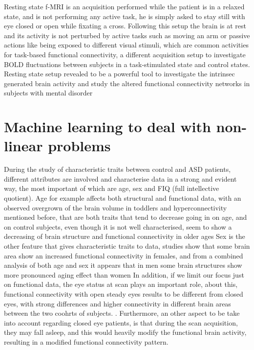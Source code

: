 \documentclass[10pt]{report}
\begin{document}
Resting state f-MRI is an acquisition performed while the patient is in a relaxed state, and is not performing any active task, he is simply asked to stay still with eye closed or open while fixating a cross.
Following this setup the brain is at rest and its activity is not perturbed by active tasks such as moving an arm or passive actions like being exposed to different visual stimuli, which are common activities for task-based functional connectivity, a different acquisition setup to investigate BOLD fluctuations between subjects in a task-stimulated state and control states.
Resting state setup revealed to be a powerful tool to investigate the intrinsec generated brain activity and study the altered functional connectivity networks in subjects with mental disorder

\section{Machine learning to deal with non-linear problems}
During the study of characteristic traits between control and ASD patients, different attributes are involved and characterise data in a strong and evident way, the most important of which are age, sex and FIQ (full intellective quotient).
Age for example affects both structural and functional data, with an observed overgrown of the brain volume in toddlers and hyperconnectivity mentioned before, that are both traits that tend to decrease going in on age, and on control subjects, even though it is not well characterised, seem to show a decreasing of brain structure and functional connectivity in older ages \cite{zhangC-2016}
Sex is the other feature that gives characteristic traits to data, studies show that some brain area show an increased functional connectivity in females, and from a combined analysis of both age and sex it appears that in men some brain structures show more pronounced aging effect than women
\cite{coffey-1998}
In addition, if we limit our focus just on functional data, the eye status at scan plays an important role, about this, functional connectivity with open steady eyes results to be different from closed eyes, with strong differences and higher connectivity in different brain areas between the two coohrts of subjects.
\cite{costumero-2020}. Furthermore, an other aspect to be take into account regarding closed eye patients, is that during the scan acquisition, they may fall asleep, and this would heavily modify the functional brain activity, resulting in a modified functional connectivity pattern.
\end{document}
